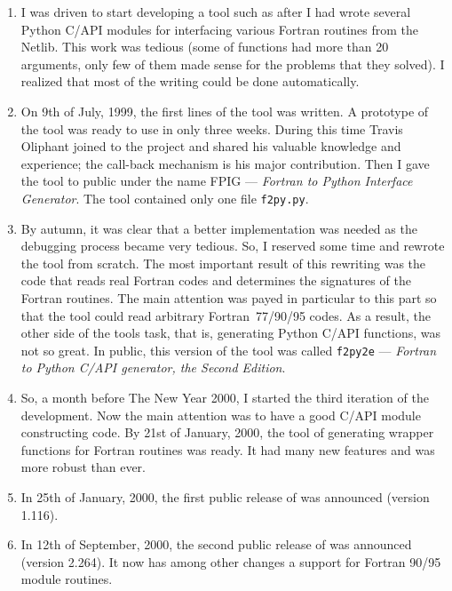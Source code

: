 \begin{enumerate}
\item I was driven to start developing a tool such as \fpy after I had
  wrote several Python C/API modules for interfacing various Fortran
  routines from the Netlib. This work was tedious (some of functions
  had more than 20 arguments, only few of them made sense for the
  problems that they solved). I realized that most of the writing
  could be done automatically.
\item On 9th of July, 1999, the first lines of the tool was written. A
  prototype of the tool was ready to use in only three weeks. During
  this time Travis Oliphant joined to the project and shared his
  valuable knowledge and experience; the call-back mechanism is his
  major contribution.  Then I gave the tool to public under the name
  FPIG --- \emph{Fortran to Python Interface Generator}. The tool contained
  only one file \texttt{f2py.py}.
\item By autumn, it was clear that a better implementation was needed
  as the debugging process became very tedious. So, I reserved some
  time and rewrote the tool from scratch. The most important result of
  this rewriting was the code that reads real Fortran codes and
  determines the signatures of the Fortran routines. The main
  attention was payed in particular to this part so that the tool
  could read arbitrary Fortran~77/90/95 codes. As a result, the other
  side of the tools task, that is, generating Python C/API functions,
  was not so great. In public, this version of the tool was called
  \texttt{f2py2e} --- \emph{Fortran to Python C/API generator, the
    Second Edition}.
\item So, a month before The New Year 2000, I started the third
  iteration of the \fpy development. Now the main attention was to
  have a good C/API module constructing code. By 21st of January,
  2000, the tool of generating wrapper functions for Fortran routines
  was ready. It had many new features and was more robust than ever.
\item In 25th of January, 2000, the first public release of \fpy was
  announced (version 1.116).
\item In 12th of September, 2000, the second public release of \fpy was
  announced (version 2.264). It now has among other changes a support
  for Fortran 90/95 module routines.
\end{enumerate}

